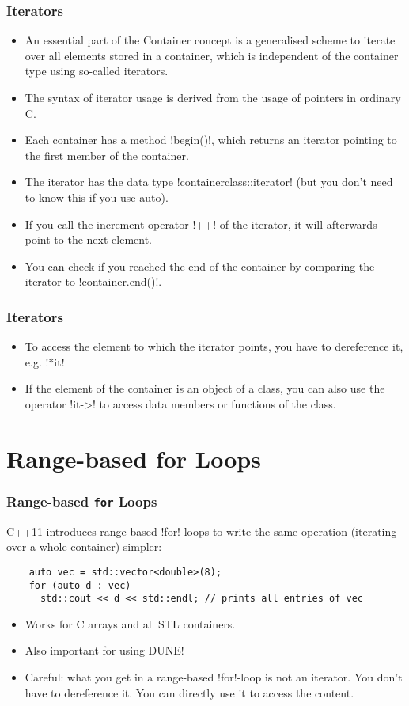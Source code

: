 \begin{frame}
\frametitle{Iterators}
\begin{itemize}
\item An essential part of the Container concept is a generalised scheme to iterate over all elements stored in a container, which is independent of the container type using so-called iterators.
\item The syntax of iterator usage is derived from the usage of pointers in ordinary C.
\item Each container has a method \inline!begin()!, which returns an iterator pointing to the first member of the container.
\item The iterator has the data type \inline!containerclass::iterator! (but you don't need to know this if you use auto).
\item If you call the increment operator \inline!++! of the iterator, it will afterwards point to the next element.
\item You can check if you reached the end of the container by comparing the iterator to \inline!container.end()!.
\end{itemize}
\end{frame}

\begin{frame}
\frametitle<presentation>{Iterators}
\begin{itemize}
\item To access the element to which the iterator points, you have to dereference it, e.g. \inline!*it!
\item If the element of the container is an object of a class, you can also use the operator \inline!it->! to access data members or functions of the class.
\end{itemize}

\end{frame}

\section{Range-based for Loops}

\begin{frame}[fragile]
  \frametitle<presentation>{Range-based \texttt{for} Loops}
  C++11 introduces range-based \inline!for! loops to write the same operation (iterating over a whole container) simpler:
  \begin{lstlisting}
    auto vec = std::vector<double>(8);
    for (auto d : vec)
      std::cout << d << std::endl; // prints all entries of vec
  \end{lstlisting}
  \begin{itemize}
  \item Works for C arrays and all STL containers.
  \item Also important for using DUNE!
  \item Careful: what you get in a range-based \inline!for!-loop is not an iterator. You don't have to dereference it. You can directly use it to access the content.
  \end{itemize}
\end{frame}

